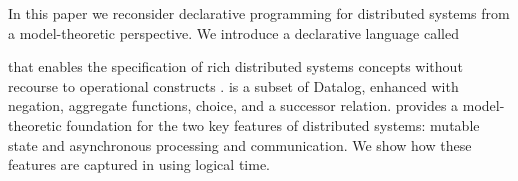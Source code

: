 In this paper we reconsider declarative programming for distributed
systems from a model-theoretic perspective. We introduce a declarative
language called \lang
\begin{comment}
\footnote{\small \lang is intended as a precursor
  language for \textbf{Bloom}, a high-level language for programming
  distributed systems that will replace Overlog in the \textbf{BOOM}
  project~\cite{boom-eurosys}.  As such, it is derived from the
  character Stephen Dedalus in James Joyce's \emph{Ulysses}, whose
  dense and precise chapters precede those of the novel's hero,
  Leopold Bloom.  The character Dedalus, in turn, was partly derived
  from Daedalus, the greatest of the Greek engineers and father of
  Icarus.  Unlike Overlog, which flew too close to the sun, Dedalus
  remains firmly grounded.  } 
\end{comment}
that enables the specification of rich
distributed systems concepts without recourse to operational
constructs .  \lang is a subset of
Datalog, enhanced with negation, aggregate functions, choice,
and a successor relation.  
\lang provides a model-theoretic 
foundation
for the two key features of distributed systems: mutable state and
asynchronous processing and communication.  We show how these features
are captured in \lang using logical time. 



